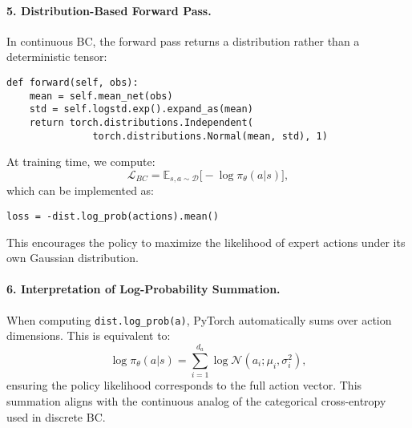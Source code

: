 \documentclass[12pt]{article}
\begin{document}
\paragraph{5. Distribution-Based Forward Pass.}
In continuous BC, the forward pass returns a distribution rather than a deterministic tensor:
\begin{verbatim}
def forward(self, obs):
    mean = self.mean_net(obs)
    std = self.logstd.exp().expand_as(mean)
    return torch.distributions.Independent(
               torch.distributions.Normal(mean, std), 1)
\end{verbatim}
At training time, we compute:
\[
\mathcal{L}_{BC} = 
\mathbb{E}_{s,a \sim \mathcal{D}}
\big[-\log \pi_\theta(a|s)\big],
\]
which can be implemented as:
\begin{verbatim}
loss = -dist.log_prob(actions).mean()
\end{verbatim}
This encourages the policy to maximize the likelihood of expert actions under its own Gaussian distribution.

\paragraph{6. Interpretation of Log-Probability Summation.}
When computing \texttt{dist.log\_prob(a)}, PyTorch automatically sums over action dimensions.
This is equivalent to:
\[
\log \pi_\theta(a|s) = 
\sum_{i=1}^{d_a} \log \mathcal{N}(a_i; \mu_i, \sigma_i^2),
\]
ensuring the policy likelihood corresponds to the full action vector.
This summation aligns with the continuous analog of the categorical cross-entropy used in discrete BC.
\end{document}
